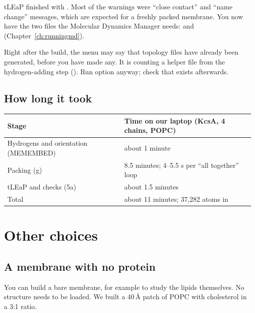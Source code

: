 tLEaP finished with . Most of the warnings
were ``close contact'' and ``name change'' messages, which are expected for a
freshly packed membrane. You now have the two files the Molecular Dynamics
Manager needs:  and 
(Chapter~\ref{ch:runningmd}).

\begin{watchout}
Right after the build, the  menu may say that topology files have
already been generated, before you have made any. It is counting a helper
file from the hydrogen-adding step (). Run
option  anyway; check that  exists afterwards.
\end{watchout}

\subsection{How long it took}

\begin{tabularx}{\linewidth}{@{}lL@{}}
\toprule
\textbf{Stage} & \textbf{Time on our laptop (KcsA, 4 chains, POPC)} \\
\midrule
Hydrogens and orientation (MEMEMBED) & about 1 minute \\
Packing (\textsf{g}) & 8.5 minutes; 4--5.5 s per ``all together'' loop \\
tLEaP and checks (\textsf{5a}) & about 1.5 minutes \\
Total & about 11 minutes; 37,282 atoms in  \\
\bottomrule
\end{tabularx}

\section{Other choices}

\subsection{A membrane with no protein}

You can build a bare membrane, for example to study the lipids themselves. No
structure needs to be loaded. We built a 40\,\AA{} patch of POPC with
cholesterol in a 3:1 ratio.

